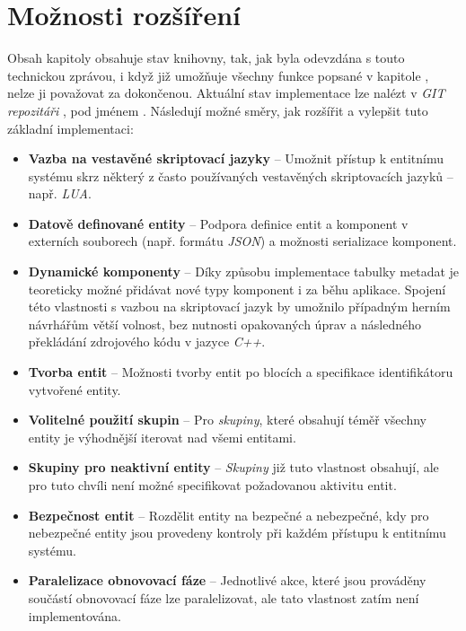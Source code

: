 \pagebreak
\section{Možnosti rozšíření}
\label{Chap:ExtensionOptions}

Obsah kapitoly  obsahuje stav knihovny, tak, jak byla odevzdána s touto technickou zprávou, i když již umožňuje všechny funkce popsané v kapitole , nelze ji považovat za dokončenou. Aktuální stav implementace lze nalézt v \emph{GIT repozitáři} \cite{EntropyGit}, pod jménem . Následují možné směry, jak rozšířit a vylepšit tuto základní implementaci: 

\begin{itemize}
	\item \textbf{Vazba na vestavěné skriptovací jazyky} -- Umožnit přístup k entitnímu systému skrz některý z často používaných vestavěných skriptovacích jazyků -- např. \emph{LUA}. 
	\item \textbf{Datově definované entity} -- Podpora definice entit a komponent v externích souborech (např. formátu \emph{JSON}) a možnosti serializace komponent.
	\item \textbf{Dynamické komponenty} -- Díky způsobu implementace tabulky metadat je teoreticky možné přidávat nové typy komponent i za běhu aplikace. Spojení této vlastnosti s vazbou na skriptovací jazyk by umožnilo případným herním návrhářům větší volnost, bez nutnosti opakovaných úprav a následného překládání zdrojového kódu v jazyce \emph{C++}.
	\item \textbf{Tvorba entit} -- Možnosti tvorby entit po blocích a specifikace identifikátoru vytvořené entity.
	\item \textbf{Volitelné použití skupin} -- Pro \emph{skupiny}, které obsahují téměř všechny entity je výhodnější iterovat nad všemi entitami. 
	\item \textbf{Skupiny pro neaktivní entity} -- \emph{Skupiny} již tuto vlastnost obsahují, ale pro tuto chvíli není možné specifikovat požadovanou aktivitu entit.
	\item \textbf{Bezpečnost entit} -- Rozdělit entity na bezpečné a nebezpečné, kdy pro nebezpečné entity jsou provedeny kontroly při každém přístupu k entitnímu systému.
	\item \textbf{Paralelizace obnovovací fáze} -- Jednotlivé akce, které jsou prováděny součástí obnovovací fáze lze paralelizovat, ale tato vlastnost zatím není implementována.
\end{itemize}

